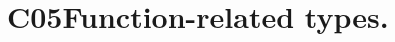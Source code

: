 \hypertarget{group___c05_function___t_y_p_e_s}{}\section{C05\+Function-\/related types.}
\label{group___c05_function___t_y_p_e_s}
